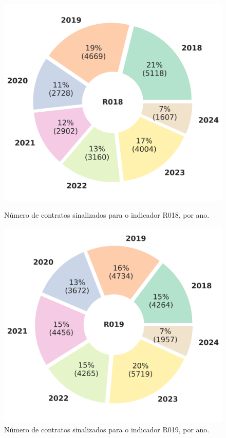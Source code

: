 \begin{figure}[H]
	\centering
	\begin{minipage}{.44\linewidth}
		\includegraphics[width=\linewidth]{imagens/final/circle_R018.png}
		\caption{Número de contratos sinalizados para o indicador R018, por ano.}
		\label{final4}
		
	\end{minipage}
	\hfill
	\begin{minipage}{.44\linewidth}
		\includegraphics[width=\linewidth]{imagens/final/circle_R019.png}
		\caption{Número de contratos sinalizados para o indicador R019, por ano.}
		\label{final5}
				
	\end{minipage}
\end{figure}




